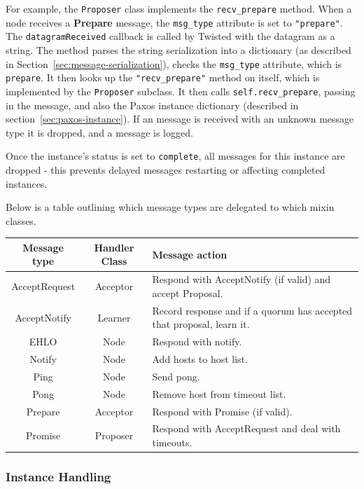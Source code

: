 \documentclass[12pt,twoside,notitlepage]{report}
\newcommand{\msg}[1] {{\bf #1}}         %
\begin{document}
For example, the \verb+Proposer+ class implements the \verb+recv_prepare+ method. When a node
receives a \msg{Prepare} message, the \verb+msg_type+ attribute is set to \verb+"prepare"+. The
\verb+datagramReceived+ callback is called by Twisted with the datagram as a string. The method
parses the string serialization into a dictionary (as described in
Section~\ref{sec:message-serialization}), checks the \verb+msg_type+ attribute, which is
\verb+prepare+. It then looks up the \verb+"recv_prepare"+ method on itself, which is implemented
by the \verb+Proposer+ subclass. It then calls \verb+self.recv_prepare+, passing in the message,
and also the Paxos instance dictionary (described in section~\ref{sec:paxos-instance}). If an
message is received with an unknown message type it is dropped, and a message is logged.

Once the instance's status is set to \verb+complete+, all messages for this instance are dropped -
this prevents delayed messages restarting or affecting completed instances.

Below is a table outlining which message types are delegated to which mixin classes. \\

\begin{tabular}{ | c | c | p{7cm} | }
  \hline
  {\bf Message type} & {\bf Handler Class} & {\bf Message action} \\ \hline
  AcceptRequest & Acceptor & Respond with AcceptNotify (if valid) and accept Proposal. \\ \hline
  AcceptNotify & Learner & Record response and if a quorum has accepted that proposal, learn it. \\ \hline
  EHLO & Node & Respond with notify. \\ \hline
  Notify & Node & Add hosts to host list. \\ \hline
  Ping & Node & Send pong.  \\ \hline
  Pong & Node & Remove host from timeout list. \\ \hline
  Prepare & Acceptor & Respond with Promise (if valid). \\ \hline
  Promise & Proposer & Respond with AcceptRequest and deal with timeouts. \\ \hline
\end{tabular}

\subsubsection{Instance Handling}
\end{document}
